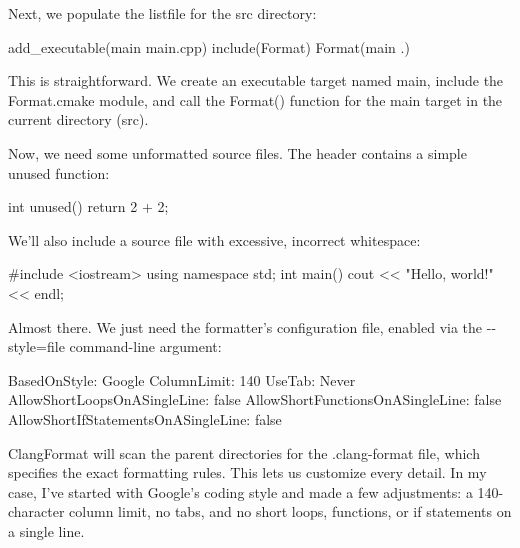 

Next, we populate the listfile for the src directory:


\begin{cmake}
add_executable(main main.cpp)
include(Format)
Format(main .)
\end{cmake}

This is straightforward. We create an executable target named main, include the Format.cmake module, and call the Format() function for the main target in the current directory (src).

Now, we need some unformatted source files. The header contains a simple unused function:


\begin{cpp}
int unused() { return 2 + 2; }
\end{cpp}

We’ll also include a source file with excessive, incorrect whitespace:


\begin{cpp}
#include <iostream>
                                using namespace std;
                    int main() {
        cout << "Hello, world!" << endl;
                                            }
\end{cpp}

Almost there. We just need the formatter’s configuration file, enabled via the -{}-style=file command-line argument:



\begin{shell}
BasedOnStyle: Google
ColumnLimit: 140
UseTab: Never
AllowShortLoopsOnASingleLine: false
AllowShortFunctionsOnASingleLine: false
AllowShortIfStatementsOnASingleLine: false
\end{shell}

ClangFormat will scan the parent directories for the .clang-format file, which specifies the exact formatting rules. This lets us customize every detail. In my case, I’ve started with Google’s coding style and made a few adjustments: a 140-character column limit, no tabs, and no short loops, functions, or if statements on a single line.

